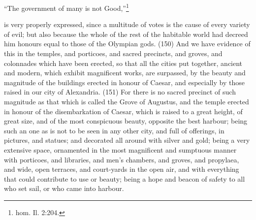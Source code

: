 ``The government of many is not Good,''\footnote{hom. Il. 2:204.}

is very properly expressed, since a multitude of votes is the cause of every variety of evil; but also
because the whole of the rest of the habitable world had decreed him honours equal to those of the
Olympian gods. (150) And we have evidence of this in the temples, and porticoes, and sacred
precincts, and groves, and colonnades which have been erected, so that all the cities put together,
ancient and modern, which exhibit magnificent works, are surpassed, by the beauty and magnitude
of the buildings erected in honour of Caesar, and especially by those raised in our city of
Alexandria. (151) For there is no sacred precinct of such magnitude as that which is called the
Grove of Augustus, and the temple erected in honour of the disembarkation of Caesar, which is
raised to a great height, of great size, and of the most conspicuous beauty, opposite the best
harbour; being such an one as is not to be seen in any other city, and full of offerings, in pictures,
and statues; and decorated all around with silver and gold; being a very extensive space,
ornamented in the most magnificent and sumptuous manner with porticoes, and libraries, and
men's chambers, and groves, and propylaea, and wide, open terraces, and court-yards in the open
air, and with everything that could contribute to use or beauty; being a hope and beacon of safety
to all who set sail, or who came into harbour.

